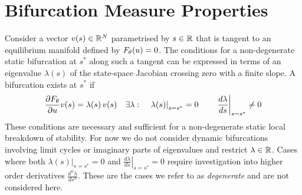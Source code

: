 \section{Bifurcation Measure Properties}
\label{appendix:conditions}
Consider a vector $v(s)\in\mathbb{R}^N$ parametrised by $s\in\mathbb{R}$ that is tangent to an equilibrium manifold defined by $F_{\theta}(u)=0$. The conditions for a non-degenerate static bifurcation at $s^*$ along such a tangent can be expressed in terms of an eigenvalue $\lambda(s)$ of the state-space Jacobian crossing zero with a finite slope. A bifurcation exists at $s^*$ if
\begin{align}
    \frac{\partial F_{\theta}}{\partial u}v(s)=\lambda(s) \,v(s)
    \quad\exists\lambda:\quad
    \left.\lambda(s)\right|_{s=s^*}=0
    \qquad
    \left.\frac{d\lambda}{ds}\right|_{s=s^*}\neq 0
    \label{eq:conditions}
\end{align}
These conditions are necessary and sufficient for a non-degenerate static local breakdown of stability. For now we do not consider dynamic bifurcations involving limit cycles or imaginary parts of eigenvalues and restrict $\lambda\in\mathbb{R}$. Cases where both $\left.\lambda(s)\right|_{s=s^*}=0$ and $\left.\frac{d\lambda}{ds}\right|_{s=s^*}=0$ require investigation into higher order derivatives $\frac{d^n\lambda}{ds^n}$. These are the cases we refer to as \emph{degenerate} and are not considered here.

